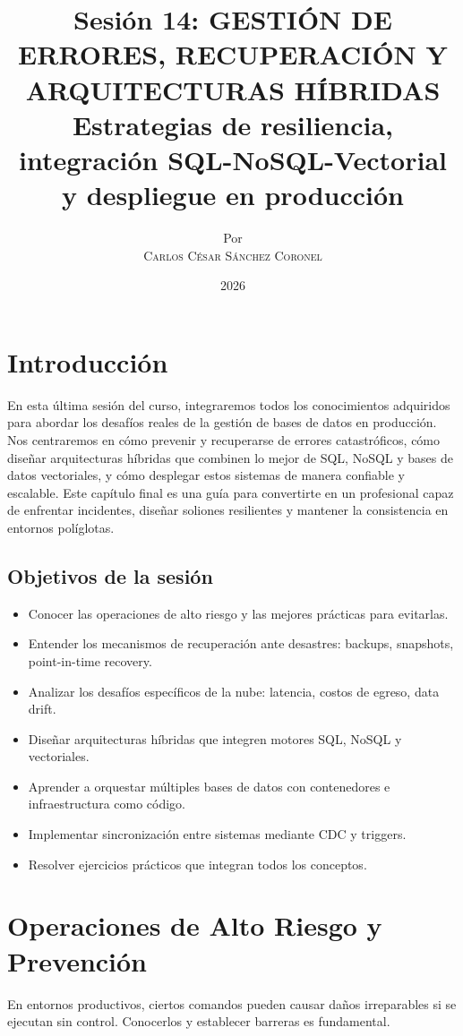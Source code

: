 \documentclass[12pt,a4paper,openany,oneside]{book}
\title{
    \Huge \textbf{Sesión 14: GESTIÓN DE ERRORES, RECUPERACIÓN Y ARQUITECTURAS HÍBRIDAS} \\
    \large Estrategias de resiliencia, integración SQL-NoSQL-Vectorial y despliegue en producción
}
\author{
    \small Por \\ \vspace{0.2cm}
    \Large \textsc{Carlos César Sánchez Coronel}
}
\date{2026}
\begin{document}
\maketitle

\tableofcontents
{}

\chapter{Introducción}
En esta última sesión del curso, integraremos todos los conocimientos adquiridos para abordar los desafíos reales de la gestión de bases de datos en producción. Nos centraremos en cómo prevenir y recuperarse de errores catastróficos, cómo diseñar arquitecturas híbridas que combinen lo mejor de SQL, NoSQL y bases de datos vectoriales, y cómo desplegar estos sistemas de manera confiable y escalable. Este capítulo final es una guía para convertirte en un profesional capaz de enfrentar incidentes, diseñar soliones resilientes y mantener la consistencia en entornos políglotas.

\section{Objetivos de la sesión}
\begin{itemize}
    \item Conocer las operaciones de alto riesgo y las mejores prácticas para evitarlas.
    \item Entender los mecanismos de recuperación ante desastres: backups, snapshots, point-in-time recovery.
    \item Analizar los desafíos específicos de la nube: latencia, costos de egreso, data drift.
    \item Diseñar arquitecturas híbridas que integren motores SQL, NoSQL y vectoriales.
    \item Aprender a orquestar múltiples bases de datos con contenedores e infraestructura como código.
    \item Implementar sincronización entre sistemas mediante CDC y triggers.
    \item Resolver ejercicios prácticos que integran todos los conceptos.
\end{itemize}

\chapter{Operaciones de Alto Riesgo y Prevención}
En entornos productivos, ciertos comandos pueden causar daños irreparables si se ejecutan sin control. Conocerlos y establecer barreras es fundamental.
\end{document}
